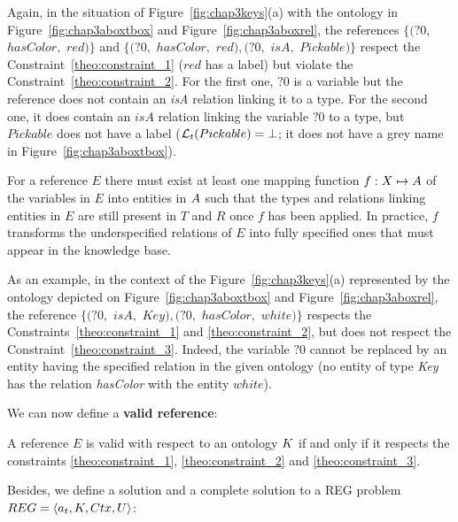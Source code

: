 \documentclass[a4paper,11pt,twoside]{StyleThese}
\begin{document}
Again, in the situation of Figure~\ref{fig:chap3keys}(a) with the ontology in Figure~\ref{fig:chap3aboxtbox} and Figure~\ref{fig:chap3aboxrel}, the references $\{(?0,$ $hasColor,$ $red)\}$ and $\{(?0,$ $hasColor,$ $red), (?0,$ $isA,$ $Pickable)\}$ respect the Constraint~\ref{theo:constraint_1} ($red$ has a label) but violate the Constraint~\ref{theo:constraint_2}. For the first one, $?0$ is a variable but the reference does not contain an \textit{isA} relation linking it to a type. For the second one, it does contain an $isA$ relation linking the variable $?0$ to a type, but $Pickable$ does not have a label ($\mathcal{L}_t(Pickable) = \bot$; it does not have a grey name in Figure~\ref{fig:chap3aboxtbox}).

\begin{constraint}
\label{theo:constraint_3}
For a reference $E$ there must exist at least one mapping function $f: X \mapsto A$ of the variables in $E$ into entities in $A$ such that the types and relations linking entities in $E$ are still present in $T$ and $R$ once $f$ has been applied.
In practice, $f$ transforms the underspecified relations of $E$ into fully specified ones that must appear in the knowledge base.
\end{constraint}

As an example, in the context of the Figure~\ref{fig:chap3keys}(a) represented by the ontology depicted on Figure~\ref{fig:chap3aboxtbox} and Figure~\ref{fig:chap3aboxrel}, the reference $\{(?0,$ $isA,$ $Key), (?0,$ $hasColor,$ $white)\}$ respects the Constraints~\ref{theo:constraint_1} and \ref{theo:constraint_2}, but does not respect the Constraint~\ref{theo:constraint_3}. Indeed, the variable $?0$ cannot be replaced by an entity having the specified relation in the given ontology (no entity of type \textit{Key} has the relation \textit{hasColor} with the entity $white$).

We can now define a \textbf{valid reference}:

\begin{definition}
\label{theo:valid_ref}
A reference $E$ is valid with respect to an ontology $K$ if and only if it respects the constraints \ref{theo:constraint_1}, \ref{theo:constraint_2} and \ref{theo:constraint_3}.
\end{definition}

Besides, we define a solution and a complete solution to a REG problem $REG = \langle a_t, K, Ctx, U \rangle$:
\end{document}

